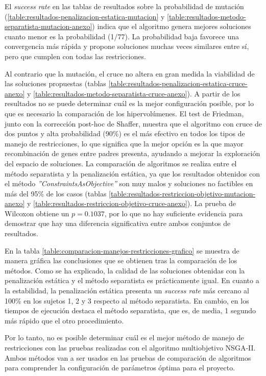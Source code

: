 El \textit{success rate} en las tablas de resultados sobre la probabilidad de mutación (\ref{table:resultados-penalizacion-estatica-mutacion} y \ref{table:resultados-metodo-separatista-mutacion-anexo}) indica que el algoritmo genera mejores soluciones cuanto menor es la probabilidad (1/77). La probabilidad baja favorece una convergencia más rápida y propone soluciones muchas veces similares entre sí, pero que cumplen con todas las restricciones.

Al contrario que la mutación, el cruce no altera en gran medida la viabilidad de las soluciones propuestas (tablas \ref{table:resultados-penalizacion-estatica-cruce-anexo} y \ref{table:resultados-metodo-separatista-cruce-anexo}). A partir de los resultados no se puede determinar cuál es la mejor configuración posible, por lo que es necesario la comparación de los hipervolúmenes. El test de Friedman, junto con la corrección post-hoc de Shaffer, muestra que el algoritmo con cruce de dos puntos y alta probabilidad (90\%) es el más efectivo en todos los tipos de manejo de restricciones, lo que significa que la mejor opción es la que mayor recombinación de genes entre padres presenta, ayudando a mejorar la exploración del espacio de soluciones.
\newpage
La comparación de algoritmos se realiza entre el método separatista y la penalización estática, ya que los resultados obtenidos con el método \textit{''ConstraintsAsObjective''} son muy malos y soluciones no factibles en más del 95\% de los casos (tablas \ref{table:resultados-restriccion-objetivo-mutacion-anexo} y \ref{table:resultados-restriccion-objetivo-cruce-anexo}). La prueba de Wilcoxon obtiene un \textit{$p = 0.1037$}, por lo que no hay suficiente evidencia para demostrar que hay una diferencia significativa entre ambos conjuntos de resultados.

En la tabla \ref{table:comparacion-manejos-restricciones-grafico} se muestra de manera gráfica las conclusiones que se obtienen tras la comparación de los métodos. Como se ha explicado,  la calidad de las soluciones obtenidas con la penalización estática y el método separatista es prácticamente igual. En cuanto a la estabilidad, la penalización estática presenta un \textit{success rate} más cercano al 100\% en los sujetos 1, 2 y 3 respecto al método separatista. En cambio, en los tiempos de ejecución destaca el método separatista, que es, de media, 1 segundo más rápido que el otro procedimiento.

Por lo tanto, no es posible determinar cuál es el mejor método de manejo de restricciones con las pruebas realizadas con el algoritmo multiobjetivo NSGA-II. Ambos métodos van a ser usados en las pruebas de comparación de algoritmos para comprender la configuración de parámetros óptima para el proyecto.

